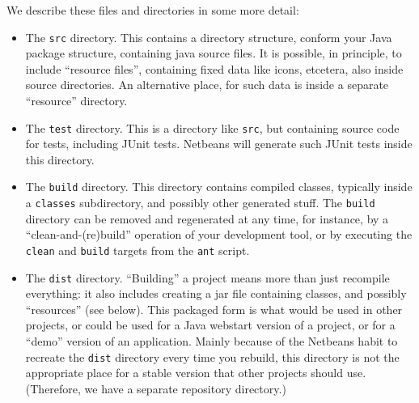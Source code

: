 We describe these files and directories in some more detail:
\begin{itemize}
\item The \verb#src# directory. This contains a directory structure, conform your Java package
structure, containing java source files.
It is possible, in principle, to include ``resource files'', containing fixed data like
icons, etcetera, also inside source directories. An alternative place, for such data is
inside a separate ``resource'' directory.
\item The \verb#test# directory. This is a directory like \verb#src#, but containing source code
for tests, including JUnit tests. Netbeans will generate such JUnit tests inside this directory.
\item The \verb#build# directory. This directory contains compiled classes, typically inside
a \verb#classes# subdirectory, and possibly other generated stuff. The \verb#build# directory
can be removed and regenerated at any time, for instance, by a ``clean-and-(re)build'' operation
of your development tool, or by executing the \verb#clean# and \verb#build# targets from the \verb#ant#
script.
\item The \verb#dist# directory. ``Building'' a project means more than just recompile everything:
it also includes creating a jar file containing classes, and possibly ``resources'' (see below).
This packaged form is what would be used in other projects, or could be used for a Java webstart
version of a project, or for a ``demo'' version of an application.
Mainly because of the Netbeans habit to recreate the \verb#dist# directory every time you rebuild,
this directory is not the appropriate place for a stable version that other projects should use.
(Therefore, we have a separate repository directory.)

\end{itemize} 

